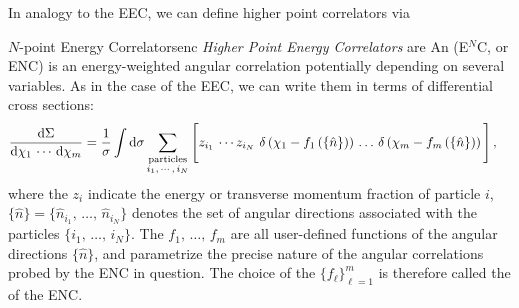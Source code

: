 In analogy to the EEC, we can define higher point correlators via
\begin{definitionbox}{\(N\)-point Energy Correlators}{enc}
    \emph{Higher Point Energy Correlators} are
    An  (E\(^N\)C, or ENC) is an energy-weighted angular correlation potentially depending on several variables.
    As in the case of the EEC, we can write them in terms of differential cross sections:
    \begin{align}
        \label{eq:generalized-enc-event}
        \frac{\dd \Sigma}{\dd \chi_1\,\cdots\,\dd \chi_m}
        =
        \frac{1}{\sigma}
        \int \dd \sigma
        \sum_{\substack{\text{particles}\\i_1,\,\cdots,\,i_N}}
        \Bigg[
            &
            z_{i_1} \, \cdots z_{i_N}
            \,\,
            \delta\le(\chi_1 - f_1\le(\{\hat{n}\}\ri)\ri)
            \,\dots\,
            \delta\le(\chi_m - f_m\le(\{\hat{n}\}\ri)\ri)
        \Bigg]
        \,,
    \end{align}
    where the \(z_i\) indicate the energy or transverse momentum fraction of particle \(i\), \(\{\hat{n}\} = \{\hat{n}_{i_1},\,\dots,\,\hat{n}_{i_N}\}\) denotes the set of angular directions associated with the particles \(\{i_1,\,\dots,\,i_N\}\).
    The \(f_1,\,\dots,\,f_m\) are all user-defined functions of the angular directions \(\{\hat{n}\}\), and parametrize the precise nature of the angular correlations probed by the ENC in question.
    The choice of the \(\{f_\ell\}_{\ell=1}^{m}\) is therefore called the  of the ENC.

\end{definitionbox}


